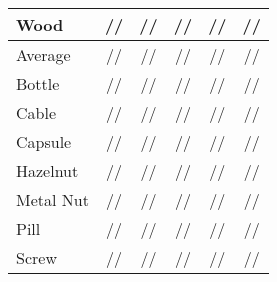 \documentclass[lettersize,journal]{IEEEtran}
\begin{document}
\begin{table*}[htbp]
\begin{tabular}{lccccc}
    Wood         & //                                         & //                                  & //                                                                          & {\color{blue}{}}/{\color{blue}{}}/{\color{blue}{}} & {\color{red}{}}/{\color{red}{}}/{\color{red}{}}    \\\hline
    Average      & //                                         & //                                  & //                                                                          & {\color{red}{}}/{\color{blue}{}}/{\color{blue}{}}  & {\color{blue}{}}/{\color{red}{}}/{\color{red}{}}   \\\hline
    Bottle       & //                                         & //                                  & {\color{blue}{}}/{\color{blue}{}}/                        & {\color{red}{}}/{\color{red}{}}/{\color{blue}{}}   & {\color{red}{}}/{\color{red}{}}/{\color{red}{}}    \\
    Cable        & //                                         & //                                  & /{\color{red}{}}/                                                  & {\color{red}{}}/{\color{blue}{}}/{\color{blue}{}}  & {\color{blue}{}}//{\color{red}{}}                           \\
    Capsule      & //                                         & //                                  & {\color{blue}{}}//                                                 & /{\color{red}{}}/{\color{blue}{}}                           & {\color{red}{}}/{\color{blue}{}}/{\color{red}{}}   \\
    Hazelnut     & //                                         & //                                  & {\color{blue}{}}//{\color{blue}{}}                        & /{\color{blue}{}}/{\color{red}{}}                           & {\color{red}{}}/{\color{red}{}}/{\color{red}{}}    \\
    Metal Nut    & //                                         & //                                  & //                                                                          & {\color{red}{}}/{\color{blue}{}}/{\color{red}{}}   & {\color{blue}{}}/{\color{red}{}}/{\color{blue}{}}  \\
    Pill         & //                                         & //                                  & {\color{red}{}}/{\color{blue}{}}/{\color{red}{}} & /{\color{red}{}}/{\color{blue}{}}                           & {\color{blue}{}}/{\color{red}{}}/{\color{red}{}}   \\
    Screw        & //                                          & //                                   & //{\color{blue}{}}                                                 & {\color{blue}{}}/{\color{blue}{}}/{\color{red}{}}  & {\color{red}{}}/{\color{red}{}}/{\color{red}{}}    \\

\end{tabular}
\end{table*}
\end{document}
